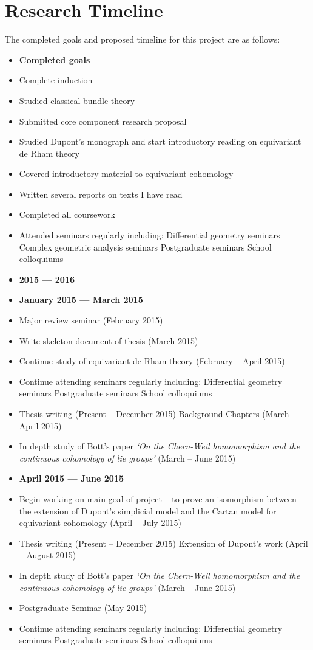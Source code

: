 \documentclass[11pt]{article}
\theoremstyle{plain}
\theoremstyle{spartan}
\begin{document}
\section*{Research Timeline}
The completed goals and proposed timeline for this project are as follows:
\begin{itemize}
\item[] \textbf{Completed goals}
\item Complete induction
\item Studied classical bundle theory
\item Submitted core component research proposal
\item Studied Dupont's monograph and start introductory reading on equivariant de Rham theory
\item Covered introductory material to equivariant cohomology
\item Written several reports on texts I have read
\item Completed all coursework
\item Attended seminars regularly including:
	\subitem Differential geometry seminars
	\subitem Complex geometric analysis seminars
	\subitem Postgraduate seminars
	\subitem School colloquiums

\item[] \textbf{2015 --- 2016}

\item[] \textbf{January 2015 --- March 2015}
\item Major review seminar (February 2015)
\item Write skeleton document of thesis (March 2015)
\item Continue study of equivariant de Rham theory (February -- April 2015)
\item Continue attending seminars regularly including:
	\subitem Differential geometry seminars
	\subitem Postgraduate seminars
	\subitem School colloquiums
\item Thesis writing (Present -- December 2015)
	\subitem Background Chapters (March -- April 2015)
\item In depth study of Bott's paper \emph{`On the Chern-Weil homomorphism and the continuous cohomology of lie groups'} (March -- June 2015)

\item[] \textbf{April 2015 --- June 2015}

\item Begin working on main goal of project -- to prove an isomorphism between the extension of Dupont's simplicial model  and the Cartan model for equivariant cohomology (April -- July 2015)
\item Thesis writing (Present -- December 2015)
	\subitem Extension of Dupont's work (April -- August 2015)
\item In depth study of Bott's paper \emph{`On the Chern-Weil homomorphism and the continuous cohomology of lie groups'} (March -- June 2015)
\item Postgraduate Seminar (May 2015)
\item Continue attending seminars regularly including:
	\subitem Differential geometry seminars
	\subitem Postgraduate seminars
	\subitem School colloquiums


\end{itemize}
\end{document}
